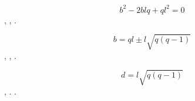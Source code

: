 \documentclass[a4paper]{article}
\begin{document}
\begin{equation*}
b^2-2\mathit{blq}+ql^2=0
\end{equation*}
{\CYRO}{\cyrb}{\cyrr}{\cyra}{\cyrt}{\cyri}{\cyrm} {\cyrv}{\cyrn}{\cyri}{\cyrm}{\cyra}{\cyrn}{\cyri}{\cyre}
{\cyrn}{\cyra} {\cyrt}{\cyro}, {\cyrch}{\cyrt}{\cyro} {\cyre}{\cyrs}{\cyrl}{\cyri} {\cyro}{\cyrb}{\cyra}
{\cyrz}{\cyra}{\cyrr}{\cyrya}{\cyrd}{\cyra} {\cyrs}{\cyri}{\cyrs}{\cyrt}{\cyre}{\cyrm}{\cyrery}
{\cyrp}{\cyro}{\cyrl}{\cyro}{\cyrzh}{\cyri}{\cyrt}{\cyre}{\cyrl}{\cyrsftsn}{\cyrn}{\cyrery},
{\cyrv}{\cyrery}{\cyrb}{\cyrr}{\cyra}{\cyrt}{\cyrsftsn} {\cyrt}{\cyra}{\cyrk}{\cyri}{\cyrm}
{\cyro}{\cyrb}{\cyrr}{\cyra}{\cyrz}{\cyro}{\cyrm} {\cyrs}{\cyri}{\cyrs}{\cyrt}{\cyre}{\cyrm}{\cyru}
{\cyro}{\cyrt}{\cyrs}{\cyrch}{\cyre}{\cyrt}{\cyra} {\cyrn}{\cyre} {\cyru}{\cyrd}{\cyra}{\cyre}{\cyrt}{\cyrs}{\cyrya}.

\begin{equation*}
b=\mathit{ql}\pm l\sqrt{q\left(q-1\right)}
\end{equation*}
{\CYRR}{\cyra}{\cyrs}{\cyrs}{\cyrch}{\cyri}{\cyrt}{\cyra}{\cyrv}, {\cyrg}{\cyrd}{\cyre}
{\cyrd}{\cyro}{\cyrl}{\cyrzh}{\cyrn}{\cyra} {\cyrn}{\cyra}{\cyrh}{\cyro}{\cyrd}{\cyri}{\cyrt}{\cyrsftsn}{\cyrs}{\cyrya}
{\cyrt}{\cyro}{\cyrch}{\cyrk}{\cyra} {\cyro}{\cyrt}{\cyrch}{\cyre}{\cyrt}{\cyra},
{\cyro}{\cyrp}{\cyrr}{\cyre}{\cyrd}{\cyre}{\cyrl}{\cyri}{\cyrm}
{\cyrd}{\cyri}{\cyrp}{\cyro}{\cyrl}{\cyrsftsn}{\cyrn}{\cyrery}{\cyrishrt} {\cyrm}{\cyro}{\cyrm}{\cyre}{\cyrn}{\cyrt}.

\begin{equation*}
d=l\sqrt{q\left(q-1\right)}
\end{equation*}
{\CYRR}{\cyra}{\cyrs}{\cyrs}{\cyrm}{\cyro}{\cyrt}{\cyrr}{\cyri}{\cyrm} {\cyrt}{\cyra}{\cyrk}{\cyru}{\cyryu}
{\cyrs}{\cyri}{\cyrs}{\cyrt}{\cyre}{\cyrm}{\cyru} {\cyro}{\cyrt}{\cyrs}{\cyrch}{\cyre}{\cyrt}{\cyra},
{\cyrc}{\cyre}{\cyrn}{\cyrt}{\cyrr} {\cyrk}{\cyro}{\cyrt}{\cyro}{\cyrr}{\cyro}{\cyrishrt}
{\cyrn}{\cyra}{\cyrh}{\cyro}{\cyrd}{\cyri}{\cyrt}{\cyrs}{\cyrya}
{\cyrp}{\cyro}{\cyrs}{\cyre}{\cyrr}{\cyre}{\cyrd}{\cyri}{\cyrn}{\cyre} {\cyrd}{\cyrv}{\cyru}{\cyrh}
{\cyrz}{\cyra}{\cyrr}{\cyrya}{\cyrd}{\cyro}{\cyrv}.
{\CYRR}{\cyra}{\cyrs}{\cyrs}{\cyrm}{\cyro}{\cyrt}{\cyrr}{\cyri}{\cyrm}
{\cyrm}{\cyru}{\cyrl}{\cyrsftsn}{\cyrt}{\cyri}{\cyrp}{\cyro}{\cyrl}{\cyrsftsn}{\cyrn}{\cyrery}{\cyre}
{\cyrm}{\cyro}{\cyrm}{\cyre}{\cyrn}{\cyrt}{\cyrery}
{\cyro}{\cyrt}{\cyrn}{\cyro}{\cyrs}{\cyri}{\cyrt}{\cyre}{\cyrl}{\cyrsftsn}{\cyrn}{\cyro}
{\cyrt}{\cyra}{\cyrk}{\cyro}{\cyrishrt} {\cyrs}{\cyri}{\cyrs}{\cyrt}{\cyre}{\cyrm}{\cyrery}
{\cyro}{\cyrt}{\cyrs}{\cyrch}{\cyre}{\cyrt}{\cyra}.
\end{document}
